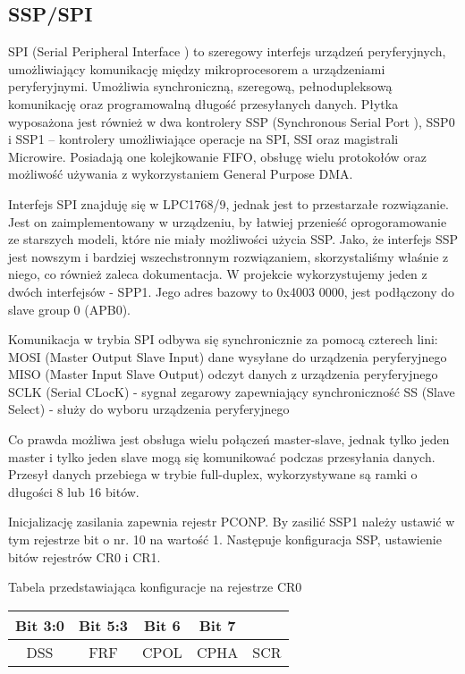 \documentclass{classrep}
\begin{document}
			
			
			
		
		
		\subsection{SSP/SPI}
		SPI (Serial Peripheral Interface ) \textendash to szeregowy interfejs urządzeń peryferyjnych, umożliwiający komunikację między mikroprocesorem a urządzeniami peryferyjnymi. Umożliwia synchroniczną, szeregową, pełnodupleksową komunikację oraz programowalną długość przesyłanych danych.
		Płytka wyposażona jest również w dwa kontrolery SSP (Synchronous Serial Port ), SSP0 i SSP1 – kontrolery umożliwiające operacje na SPI, SSI oraz magistrali Microwire. Posiadają one kolejkowanie FIFO, obsługę 	wielu protokołów oraz możliwość używania z wykorzystaniem General Purpose DMA.
		
		Interfejs SPI znajduję się w LPC1768/9, jednak jest to przestarzałe rozwiązanie. Jest on zaimplementowany w urządzeniu, by łatwiej przenieść oprogoramowanie ze starszych modeli, które nie miały możliwości użycia SSP. Jako, że interfejs SSP jest nowszym i bardziej wszechstronnym rozwiązaniem, skorzystaliśmy właśnie z niego, co również zaleca dokumentacja. W projekcie wykorzystujemy jeden z dwóch interfejsów - SPP1. Jego adres bazowy to 0x4003 0000, jest podłączony do slave group 0 (APB0).
		
		 	Komunikacja w trybia SPI odbywa się synchronicznie za pomocą czterech lini:
		 \textbullet MOSI (Master Output Slave Input) \textendash dane wysyłane do urządzenia peryferyjnego
		 \textbullet MISO (Master Input Slave Output) \textendash odczyt danych z urządzenia peryferyjnego 
		 \textbullet SCLK (Serial CLocK) - sygnał zegarowy zapewniający synchroniczność
		 \textbullet SS (Slave Select) - służy do wyboru urządzenia peryferyjnego
		 
		 Co prawda możliwa jest obsługa wielu połączeń master-slave, jednak tylko jeden master i tylko jeden slave mogą się komunikować podczas przesyłania danych. Przesył danych przebiega w trybie full-duplex, wykorzystywane są ramki o długości 8 lub 16 bitów. 
		 
		 Inicjalizację zasilania zapewnia rejestr PCONP. By zasilić SSP1 należy ustawić w tym rejestrze bit o nr. 10 na wartość 1. Następuje konfiguracja SSP, ustawienie bitów rejestrów CR0 i CR1.
		 
		 \begin{center}
		 	Tabela przedstawiająca konfiguracje na rejestrze CR0
		 
		 
		 \begin{tabular}{|c|c|c|c|c|}
		 	\hline 
		 Bit 3:0  & Bit 5:3  & Bit 6  & Bit 7  &  \\ 
		 	\hline 
		 DSS & FRF  & CPOL  & CPHA & SCR \\ 
		 	\hline 
		 \end{tabular} 
	 \end{center}
	 
\end{document}
